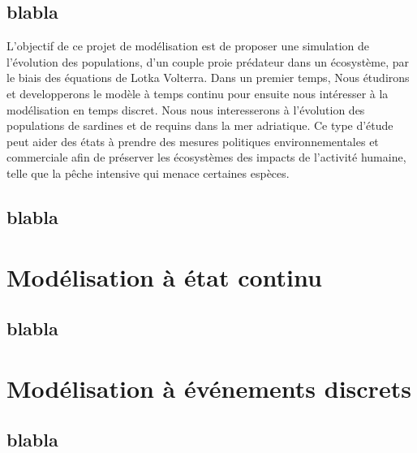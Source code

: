 \documentclass[a4paper, 11pt]{report}%
\begin{document}
        \subsection{blabla}
        L'objectif de ce projet de modélisation est de proposer une simulation de l'évolution des populations,  
        d'un couple proie prédateur dans un écosystème, par le biais des équations de Lotka Volterra. Dans un premier temps,
        Nous étudirons et developperons  le modèle à temps continu pour ensuite nous intéresser à la modélisation
        en temps discret. Nous nous interesserons à l'évolution des populations de sardines et de requins
        dans la mer adriatique. Ce type d'étude peut aider des états à prendre des mesures politiques environnementales 
        et commerciale afin de préserver les écosystèmes des impacts de l'activité humaine, telle que la pêche intensive
        qui menace certaines espèces. 
        \subsection{blabla}

    \section{Modélisation à état continu}
        \subsection{blabla}

    \section{Modélisation à événements discrets}
        \subsection{blabla}

    \nocite{*}
    
    
\end{document}

